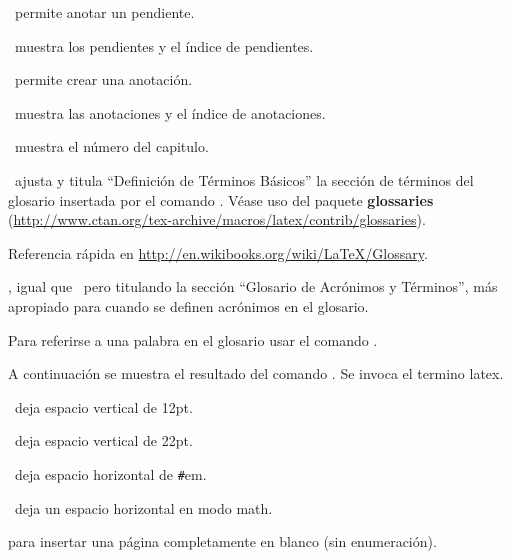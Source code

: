 
\pa\ permite anotar un pendiente.

\ muestra los pendientes y el índice de pendientes.

\pa\ permite crear una anotación.

\ muestra las anotaciones y el índice de anotaciones.

\ muestra el número del capitulo.


\ ajusta y titula ``Definición de Términos Básicos'' la sección de términos del glosario insertada por el comando . Véase uso del paquete \textbf{glossaries} (\url{http://www.ctan.org/tex-archive/macros/latex/contrib/glossaries}).

Referencia rápida en \url{http://en.wikibooks.org/wiki/LaTeX/Glossary}.

, igual que \ pero titulando la sección ``Glosario de Acrónimos y Términos'', más apropiado para cuando se definen acrónimos en el glosario.

Para referirse a una palabra en el glosario usar el comando . 

A continuación se muestra el resultado del comando . Se invoca el termino \gls{latex}.

\hacerglosario


\ deja espacio vertical de 12pt.

\ deja espacio vertical de 22pt.

\pa[\#]\ deja espacio horizontal de \texttt{\#}em.

\ deja un espacio horizontal en modo math.

 para insertar una página completamente en blanco (sin enumeración).



